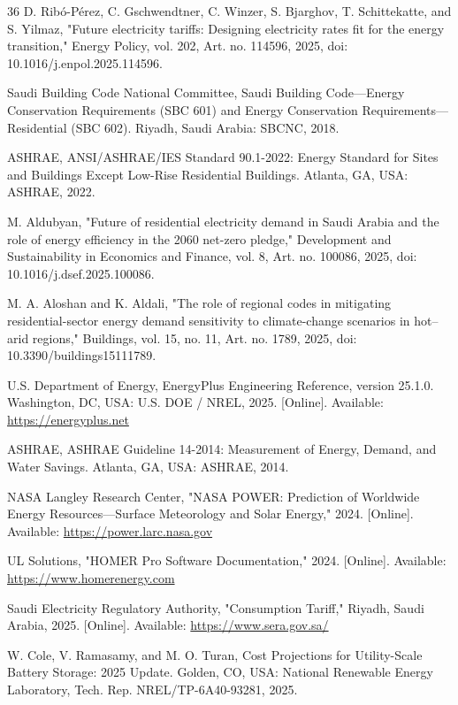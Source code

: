 \documentclass[journal,fleqn]{IEEEtran}
\begin{document}
\begin{thebibliography}{36}
 D. Ribó-Pérez, C. Gschwendtner, C. Winzer, S. Bjarghov, T. Schittekatte, and S. Yilmaz, "Future electricity tariffs: Designing electricity rates fit for the energy transition," Energy Policy, vol. 202, Art. no. 114596, 2025, doi: 10.1016/j.enpol.2025.114596.

 Saudi Building Code National Committee, Saudi Building Code---Energy Conservation Requirements (SBC 601) and Energy Conservation Requirements---Residential (SBC 602). Riyadh, Saudi Arabia: SBCNC, 2018.

 ASHRAE, ANSI/ASHRAE/IES Standard 90.1-2022: Energy Standard for Sites and Buildings Except Low-Rise Residential Buildings. Atlanta, GA, USA: ASHRAE, 2022.

 M. Aldubyan, "Future of residential electricity demand in Saudi Arabia and the role of energy efficiency in the 2060 net-zero pledge," Development and Sustainability in Economics and Finance, vol. 8, Art. no. 100086, 2025, doi: 10.1016/j.dsef.2025.100086.

 M. A. Aloshan and K. Aldali, "The role of regional codes in mitigating residential-sector energy demand sensitivity to climate-change scenarios in hot--arid regions," Buildings, vol. 15, no. 11, Art. no. 1789, 2025, doi: 10.3390/buildings15111789.

 U.S. Department of Energy, EnergyPlus Engineering Reference, version 25.1.0. Washington, DC, USA: U.S. DOE / NREL, 2025. [Online]. Available: \url{https://energyplus.net}

 ASHRAE, ASHRAE Guideline 14-2014: Measurement of Energy, Demand, and Water Savings. Atlanta, GA, USA: ASHRAE, 2014.

 NASA Langley Research Center, "NASA POWER: Prediction of Worldwide Energy Resources---Surface Meteorology and Solar Energy," 2024. [Online]. Available: \url{https://power.larc.nasa.gov}

 UL Solutions, "HOMER Pro Software Documentation," 2024. [Online]. Available: \url{https://www.homerenergy.com}

 Saudi Electricity Regulatory Authority, "Consumption Tariff," Riyadh, Saudi Arabia, 2025. [Online]. Available: \url{https://www.sera.gov.sa/}

 W. Cole, V. Ramasamy, and M. O. Turan, Cost Projections for Utility-Scale Battery Storage: 2025 Update. Golden, CO, USA: National Renewable Energy Laboratory, Tech. Rep. NREL/TP-6A40-93281, 2025.


\end{thebibliography}
\end{document}
